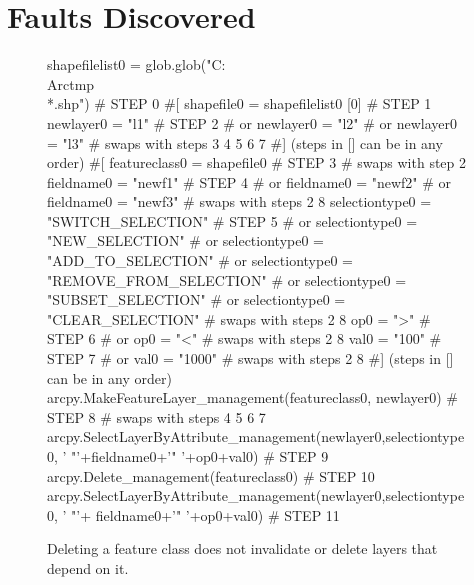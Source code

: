 \section{Faults Discovered}

\begin{figure}
{\scriptsize 
\begin{code}
shapefilelist0 = glob.glob("C:\\Arctmp\\*.shp")                             \textcolor{black!60}{\# STEP 0}
\textcolor{black!60}{\#[}
shapefile0 = shapefilelist0 [0]                                           \textcolor{black!60}{\# STEP 1}
newlayer0 = "l1"                                                          \textcolor{black!60}{\# STEP 2}
\textcolor{black!60}{\#  or newlayer0 = "l2" }
\textcolor{black!60}{\#  or newlayer0 = "l3" }
\textcolor{black!60}{\#  swaps with steps 3 4 5 6 7}
\textcolor{black!60}{\#] (steps in [] can be in any order)}
\textcolor{black!60}{\#[}
featureclass0 = shapefile0                                                \textcolor{black!60}{\# STEP 3}
\textcolor{black!60}{\#  swaps with step 2}
fieldname0 = "newf1"                                                      \textcolor{black!60}{\# STEP 4}
\textcolor{black!60}{\#  or fieldname0 = "newf2" }
\textcolor{black!60}{\#  or fieldname0 = "newf3" }
\textcolor{black!60}{\#  swaps with steps 2 8}
selectiontype0 = "SWITCH\_SELECTION"                                       \textcolor{black!60}{\# STEP 5}
\textcolor{black!60}{\#  or selectiontype0 = "NEW\_SELECTION" }
\textcolor{black!60}{\#  or selectiontype0 = "ADD\_TO\_SELECTION" }
\textcolor{black!60}{\#  or selectiontype0 = "REMOVE\_FROM\_SELECTION"}
\textcolor{black!60}{\#  or selectiontype0 = "SUBSET\_SELECTION"}
\textcolor{black!60}{\#  or selectiontype0 = "CLEAR\_SELECTION"   }
\textcolor{black!60}{\#  swaps with steps 2 8}
op0 = ">"                                                                 \textcolor{black!60}{\# STEP 6}
\textcolor{black!60}{\#  or op0 = "<" }
\textcolor{black!60}{\#  swaps with steps 2 8}
val0 = "100"                                                              \textcolor{black!60}{\# STEP 7}
\textcolor{black!60}{\#  or val0 = "1000" }
\textcolor{black!60}{\#  swaps with steps 2 8}
\textcolor{black!60}{\#] (steps in [] can be in any order)}
arcpy.MakeFeatureLayer\_management(featureclass0, newlayer0)               \textcolor{black!60}{\# STEP 8}
\textcolor{black!60}{\#  swaps with steps 4 5 6 7}
arcpy.SelectLayerByAttribute\_management(newlayer0,selectiontype0,
   ' "'+fieldname0+'" '+op0+val0)                                         \textcolor{black!60}{\# STEP 9}
arcpy.Delete\_management(featureclass0)                                    \textcolor{black!60}{\# STEP 10}
arcpy.SelectLayerByAttribute\_management(newlayer0,selectiontype0,
   ' "'+ fieldname0+'" '+op0+val0)                                        \textcolor{black!60}{\# STEP 11}
\end{code}
}
\caption{Deleting a feature class does not invalidate or delete layers that depend on it.}
\label{fault1}
\end{figure}

